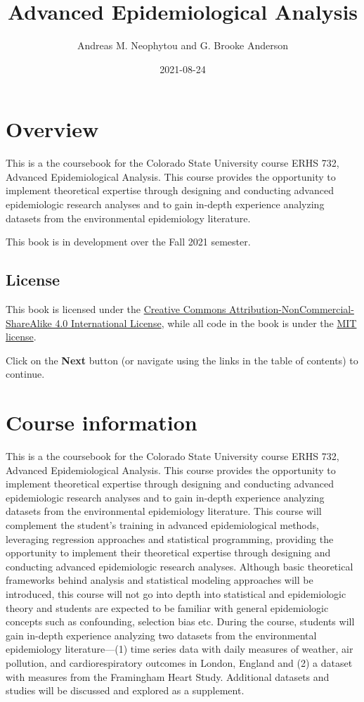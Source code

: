 \documentclass[
]{book}
\title{Advanced Epidemiological Analysis}
\author{Andreas M. Neophytou and G. Brooke Anderson}
\date{2021-08-24}
\begin{document}
\maketitle

{
\setcounter{tocdepth}{1}
\tableofcontents
}
\hypertarget{overview}{%
\chapter{Overview}\label{overview}}

This is a the coursebook for the Colorado State University course ERHS 732,
Advanced Epidemiological Analysis. This course provides the opportunity to
implement theoretical expertise through designing and conducting advanced
epidemiologic research analyses and to gain in-depth experience analyzing
datasets from the environmental epidemiology literature.

This book is in development over the Fall 2021 semester.

\hypertarget{license}{%
\section{License}\label{license}}

This book is licensed under the \href{https://creativecommons.org/licenses/by-nc-sa/4.0/}{Creative Commons
Attribution-NonCommercial-ShareAlike 4.0 International
License}, while all code in
the book is under the \href{https://opensource.org/licenses/MIT}{MIT license}.

Click on the \textbf{Next} button (or navigate using the links in the table of
contents) to continue.

\hypertarget{courseinfo}{%
\chapter{Course information}\label{courseinfo}}

This is a the coursebook for the Colorado State University course ERHS 732,
Advanced Epidemiological Analysis. This course provides the opportunity to
implement theoretical expertise through designing and conducting advanced
epidemiologic research analyses and to gain in-depth experience analyzing
datasets from the environmental epidemiology literature. This course will
complement the student's training in advanced epidemiological methods,
leveraging regression approaches and statistical programming, providing the
opportunity to implement their theoretical expertise through designing and
conducting advanced epidemiologic research analyses. Although basic theoretical frameworks behind analysis and statistical modeling approaches will be introduced, this course will not go into depth into statistical and epidemiologic theory and students are expected to be familiar with general epidemiologic concepts such as confounding, selection bias etc. During the course,
students will gain in-depth experience analyzing two datasets from the
environmental epidemiology literature---(1) time series data with daily measures
of weather, air pollution, and cardiorespiratory outcomes in London, England and
(2) a dataset with measures from the Framingham Heart Study. Additional datasets
and studies will be discussed and explored as a supplement.
\end{document}
